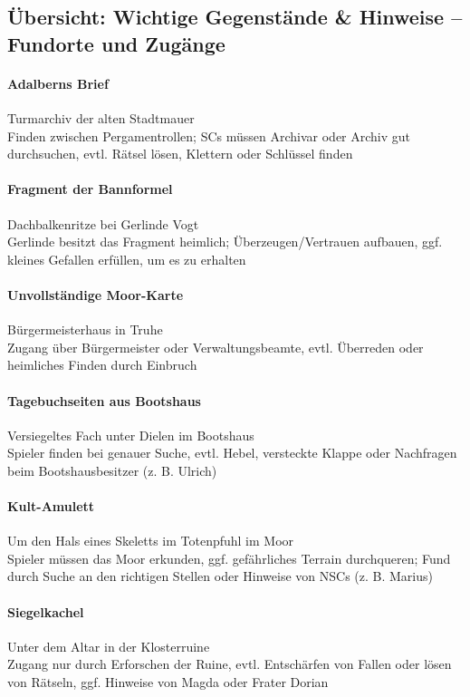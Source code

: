 \newpage
\subsection{Übersicht: Wichtige Gegenstände \& Hinweise – Fundorte und Zugänge}
\paragraph{Adalberns Brief}
Turmarchiv der alten Stadtmauer\\
Finden zwischen Pergamentrollen; SCs müssen Archivar oder Archiv gut durchsuchen, evtl. Rätsel lösen, Klettern oder Schlüssel finden
\paragraph{Fragment der Bannformel}
Dachbalkenritze bei Gerlinde Vogt\\
Gerlinde besitzt das Fragment heimlich; Überzeugen/Vertrauen aufbauen, ggf. kleines Gefallen erfüllen, um es zu erhalten
\paragraph{Unvollständige Moor-Karte}
Bürgermeisterhaus in Truhe\\
Zugang über Bürgermeister oder Verwaltungsbeamte, evtl. Überreden oder heimliches Finden durch Einbruch
\paragraph{Tagebuchseiten aus Bootshaus}
Versiegeltes Fach unter Dielen im Bootshaus\\
Spieler finden bei genauer Suche, evtl. Hebel, versteckte Klappe oder Nachfragen beim Bootshausbesitzer (z. B. Ulrich)
\paragraph{Kult-Amulett}
Um den Hals eines Skeletts im Totenpfuhl im Moor\\
Spieler müssen das Moor erkunden, ggf. gefährliches Terrain durchqueren; Fund durch Suche an den richtigen Stellen oder Hinweise von NSCs (z. B. Marius)
\paragraph{Siegelkachel}
Unter dem Altar in der Klosterruine\\
Zugang nur durch Erforschen der Ruine, evtl. Entschärfen von Fallen oder lösen von Rätseln, ggf. Hinweise von Magda oder Frater Dorian
